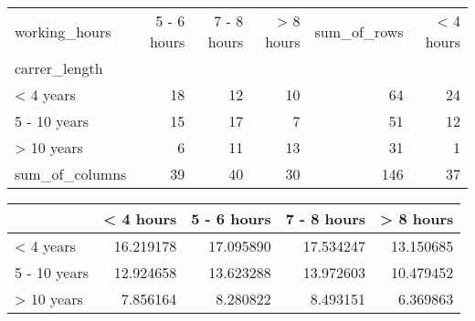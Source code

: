 \begin{tabular}{lrrrrr}
\toprule
working\_hours &  5 - 6 hours &  7 - 8 hours &  > 8 hours &  sum\_of\_rows &  < 4 hours \\
carrer\_length  &              &              &            &              &            \\
\midrule
< 4 years      &           18 &           12 &         10 &           64 &         24 \\
5 - 10 years   &           15 &           17 &          7 &           51 &         12 \\
> 10 years     &            6 &           11 &         13 &           31 &          1 \\
sum\_of\_columns &           39 &           40 &         30 &          146 &         37 \\
\bottomrule
\end{tabular}
\begin{tabular}{lrrrr}
\toprule
{}           &  < 4 hours &  5 - 6 hours &  7 - 8 hours &  > 8 hours \\
\hline\hline
< 4 years    &  16.219178 &  17.095890   &    17.534247 &  13.150685 \\
\hline
5 - 10 years &  12.924658 &  13.623288   &    13.972603 &  10.479452 \\
\hline
> 10 years   &   7.856164 &  8.280822    &     8.493151 &   6.369863 \\
\hline
\end{tabular}
